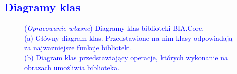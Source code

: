 \documentclass{article}
\begin{document}
        \subsection{\textcolor{blue}{Diagramy klas}}
        \begin{figure}[H]
            \centering
            \qquad
            \caption
            {
                \textcolor{blue}
                {
                (\textit{Opracowanie własne}) Diagramy klas biblioteki BIA.Core.\\
                (a) Główny diagram klas. Przedstawione na nim klasy odpowiadają za najwazniejsze funkcje biblioteki.\\
                (b) Diagram klas przedstawiający operacje, których wykonanie na obrazach umożliwia biblioteka.
                }
            }
            \label{class_diagram}
        \end{figure}
\end{document}
